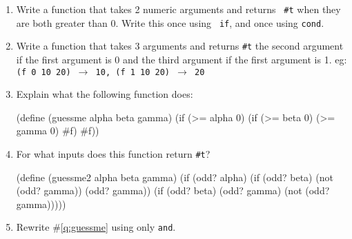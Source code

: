 \documentclass[pdftex,11pt]{article}
\begin{document}
\begin{enumerate}
\begin{minipage}{0.5\textwidth}
\begin{answer}
\underline{                         }
\end{answer}
\end{minipage}

\item Write a function that takes 2 numeric arguments and returns {\tt
    \#t} when they are both greater than 0. Write this once using {\tt
    if}, and once using {\tt cond}.
\vspace{2in}

\item Write a function that takes 3 arguments and returns {\tt \#t}
  the second argument if the first argument is 0 and the third
  argument if the first argument is 1. eg:
  {\tt (f 0 10 20) $\rightarrow$ 10, (f 1 10 20) $\rightarrow$ 20}
\vspace{1in}

\item \label{q:guessme} Explain what the following function does:
\begin{answer}
(define (guessme alpha beta gamma)
  (if (>= alpha 0)
      (if (>= beta 0) (>= gamma 0) #f)
      #f))
\end{answer}
\vspace{.5in}

\item For what inputs does this function return {\tt \#t}?
\begin{answer}
(define (guessme2 alpha beta gamma)
  (if (odd? alpha)
      (if (odd? beta) (not (odd? gamma)) (odd? gamma))
      (if (odd? beta) (odd? gamma) (not (odd? gamma)))))
\end{answer}
\vspace{.5in}

\item Rewrite \#\ref{q:guessme} using only {\tt and}.
\end{enumerate}
\end{document}

